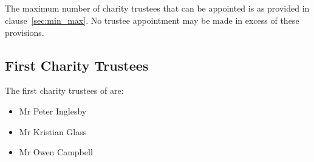         \subsection{}
        The maximum number of charity trustees that can be appointed is as provided in clause~\ref{sec:min_max}. No trustee appointment may be made in excess of these provisions.

        \subsection{First Charity Trustees}\label{sec:first_trustees}
        The first charity trustees of \shortname{} are:
        \begin{itemize}
            \item Mr Peter Inglesby
            \item Mr Kristian Glass
            \item Mr Owen Campbell
        \end{itemize}
